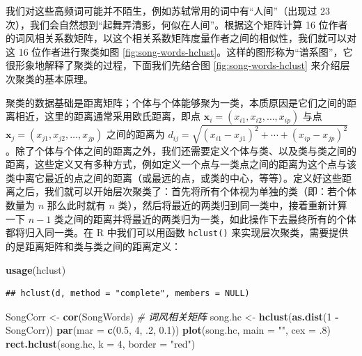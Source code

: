 \documentclass[
  b5paper,
  UTF8,twoside]{book}
\newenvironment{Shaded}{\begin{snugshade}}{\end{snugshade}}
\newcommand{\AttributeTok}[1]{\textcolor[rgb]{0.13,0.29,0.53}{#1}}
\newcommand{\CommentTok}[1]{\textcolor[rgb]{0.56,0.35,0.01}{\textit{#1}}}
\newcommand{\DecValTok}[1]{\textcolor[rgb]{0.00,0.00,0.81}{#1}}
\newcommand{\FloatTok}[1]{\textcolor[rgb]{0.00,0.00,0.81}{#1}}
\newcommand{\FunctionTok}[1]{\textcolor[rgb]{0.13,0.29,0.53}{\textbf{#1}}}
\newcommand{\NormalTok}[1]{#1}
\newcommand{\OtherTok}[1]{\textcolor[rgb]{0.56,0.35,0.01}{#1}}
\newcommand{\SpecialCharTok}[1]{\textcolor[rgb]{0.81,0.36,0.00}{\textbf{#1}}}
\newcommand{\StringTok}[1]{\textcolor[rgb]{0.31,0.60,0.02}{#1}}
\begin{document}
我们对这些高频词可能并不陌生，例如苏轼常用的词中有``人间''（出现过 23 次），我们会自然想到``起舞弄清影，何似在人间''。根据这个矩阵计算 16 位作者的词风相关系数矩阵，以这个相关系数矩阵度量作者之间的相似性，我们就可以对这 16 位作者进行聚类如图 \ref{fig:song-words-hclust}。这样的图形称为``谱系图''，它很形象地解释了聚类的过程，下面我们先结合图 \ref{fig:song-words-hclust} 来介绍层次聚类的基本原理。

聚类的数据基础是距离矩阵；个体与个体能够聚为一类，本质原因是它们之间的距离相近，这里的距离通常采用欧氏距离，即点 \(\mathbf{x}_{i}=(x_{i1},x_{i2},\ldots,x_{ip})\) 与点 \(\mathbf{x}_{j}=(x_{j1},x_{j2},\ldots,x_{jp})\) 之间的距离为 \(d_{ij}=\sqrt{(x_{i1}-x_{j1})^{2}+\cdots+(x_{ip}-x_{jp})^{2}}\)。除了个体与个体之间的距离之外，我们还需要定义个体与类、以及类与类之间的距离，这些定义又有多种方式，例如定义一个点与一类点之间的距离为这个点与该类中离它最近的点之间的距离（或最远的点，或类的中心，等等）。定义好这些距离之后，我们就可以开始层次聚类了：首先将所有个体视为单独的类（即：若个体数量为 \(n\) 那么此时就有 \(n\) 类），然后将最近的两类归到同一类中，接着重新计算一下 \(n-1\) 类之间的距离并将最近的两类归为一类，如此操作下去最终所有的个体都将归入同一类。在 R 中我们可以用函数 \texttt{hclust()} 来实现层次聚类，需要提供的是距离矩阵和类与类之间的距离定义：

\begin{Shaded}
\begin{Highlighting}[]
\FunctionTok{usage}\NormalTok{(hclust)}
\end{Highlighting}
\end{Shaded}

\begin{verbatim}
## hclust(d, method = "complete", members = NULL)
\end{verbatim}

\begin{Shaded}
\begin{Highlighting}[]
\NormalTok{SongCorr }\OtherTok{\textless{}{-}} \FunctionTok{cor}\NormalTok{(SongWords) }\CommentTok{\# 词风相关矩阵}
\NormalTok{song.hc }\OtherTok{\textless{}{-}} \FunctionTok{hclust}\NormalTok{(}\FunctionTok{as.dist}\NormalTok{(}\DecValTok{1} \SpecialCharTok{{-}}\NormalTok{ SongCorr))}
\FunctionTok{par}\NormalTok{(}\AttributeTok{mar =} \FunctionTok{c}\NormalTok{(}\FloatTok{0.5}\NormalTok{, }\DecValTok{4}\NormalTok{, .}\DecValTok{2}\NormalTok{, }\FloatTok{0.1}\NormalTok{))}
\FunctionTok{plot}\NormalTok{(song.hc, }\AttributeTok{main =} \StringTok{""}\NormalTok{, }\AttributeTok{cex =}\NormalTok{ .}\DecValTok{8}\NormalTok{)}
\FunctionTok{rect.hclust}\NormalTok{(song.hc, }\AttributeTok{k =} \DecValTok{4}\NormalTok{, }\AttributeTok{border =} \StringTok{"red"}\NormalTok{)}
\end{Highlighting}
\end{Shaded}
\end{document}
